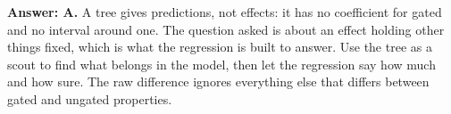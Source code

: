 \documentclass[11pt]{article}
\begin{document}
\begin{enumerate}[itemsep=14pt]
\vspace{2pt}
\textbf{Answer: A.} A tree gives predictions, not effects: it has no coefficient for gated and no interval around one. The question asked is about an effect holding other things fixed, which is what the regression is built to answer. Use the tree as a scout to find what belongs in the model, then let the regression say how much and how sure. The raw difference ignores everything else that differs between gated and ungated properties.
\vspace{4pt}

\end{enumerate}
\end{document}
